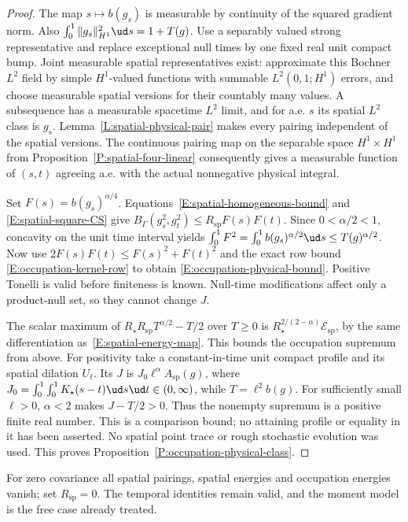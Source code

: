 \begin{proof}
  The map $s\mapsto b(g_s)$ is measurable by continuity of the
  squared gradient norm. Also
  $\int_0^1\|g_s\|_{H^1}^2\ud s=1+T(g)$.
  Use a separably valued strong representative and replace
  exceptional null times by one fixed real unit compact bump.
  Joint measurable spatial representatives exist: approximate this
  Bochner $L^2$ field by simple $H^1$-valued functions with
  summable $L^2(0,1;H^1)$ errors, and choose measurable spatial
  versions for their countably many values.
  A subsequence has a measurable spacetime $L^2$ limit, and for
  a.e. $s$ its spatial $L^2$ class is $g_s$.
  Lemma~\ref{L:spatial-physical-pair} makes every pairing
  independent of the spatial versions.
  The continuous pairing map on the separable space $H^1\times H^1$
  from Proposition~\ref{P:spatial-four-linear} consequently gives
  a measurable function of $(s,t)$ agreeing a.e. with the actual
  nonnegative physical integral.

  Set $F(s)=b(g_s)^{\alpha/4}$.
  Equations~\eqref{E:spatial-homogeneous-bound} and
  \eqref{E:spatial-square-CS} give
  $B_\Gamma(g_s^2,g_t^2)\le R_{\mathrm{sp}}F(s)F(t)$.
  Since $0<\alpha/2<1$, concavity on the unit time interval yields
  $\int_0^1F^2=\int_0^1b(g_s)^{\alpha/2}\ud s\le T(g)^{\alpha/2}$.
  Now use $2F(s)F(t)\le F(s)^2+F(t)^2$ and the exact row bound
  \eqref{E:occupation-kernel-row} to obtain
  \eqref{E:occupation-physical-bound}.
  Positive Tonelli is valid before finiteness is known.
  Null-time modifications affect only a product-null set, so
  they cannot change $J$.

  The scalar maximum of
  $R_\star R_{\mathrm{sp}}T^{\alpha/2}-T/2$ over $T\ge0$
  is $R_\star^{2/(2-\alpha)}\mathcal E_{\mathrm{sp}}$,
  by the same differentiation as~\eqref{E:spatial-energy-map}.
  This bounds the occupation supremum from above.
  For positivity take a constant-in-time unit compact profile
  and its spatial dilation $U_\ell$.
  Its $J$ is $J_0\ell^\alpha A_{\mathrm{sp}}(g)$, where
  $J_0=\int_0^1\int_0^1K_\star(s-t)\ud s\ud t\in(0,\infty)$,
  while $T=\ell^2b(g)$.
  For sufficiently small $\ell>0$, $\alpha<2$ makes
  $J-T/2>0$. Thus the nonempty supremum is a positive finite
  real number. This is a comparison bound; no attaining profile
  or equality in it has been asserted.
  No spatial point trace or rough stochastic evolution was used.
  This proves Proposition~\ref{P:occupation-physical-class}.
\end{proof}

For zero covariance all spatial pairings, spatial energies and occupation
energies vanish; set $R_{\mathrm{sp}}=0$. The temporal identities remain
valid, and the moment model is the free case already treated.
